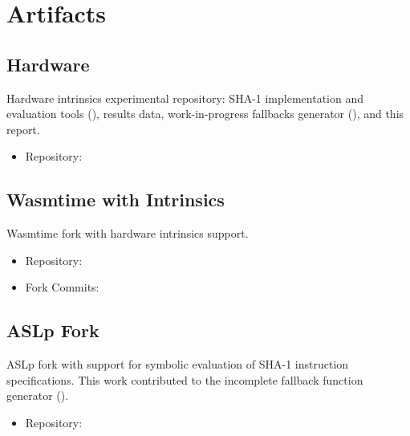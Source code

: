 \section{Artifacts}

\subsection{Hardware \wasm}

Hardware intrinsics experimental repository:
SHA-1 implementation and evaluation tools (),
results data,
work-in-progress fallbacks generator (),
and this report.

\begin{itemize}
    \item Repository: 
\end{itemize}

\subsection{Wasmtime with Intrinsics}

Wasmtime fork with hardware intrinsics support.

\begin{itemize}
    \item Repository: 
    \item Fork Commits: \href{https://github.com/mmcloughlin/hwwasmtime/compare/v27.0.0...hwwasm}{}
\end{itemize}

\subsection{ASLp Fork}

ASLp fork with support for symbolic evaluation of SHA-1 instruction
specifications. This work contributed to the incomplete fallback function
generator ().

\begin{itemize}
    \item Repository: 
\end{itemize}
